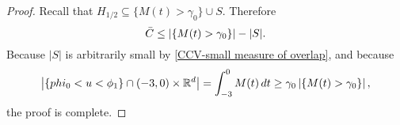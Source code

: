 \begin{proof}
Recall that $H_{1/2} \subseteq \{M(t) > \gamma_0\} \cup S$.  Therefore
\[ \bar{C} \leq \left\lvert \{M(t) > \gamma_0\} \right\rvert - |S|. \]
Because $|S|$ is arbitrarily small by \eqref{CCV-small measure of overlap}, and because
\[ \left\lvert \{phi_0 < u < \phi_1\} \cap (-3,0)\times \mathbb{R}^d \right\rvert = \int_{-3}^0 M(t) \,dt \geq \gamma_0 \left\lvert \{M(t) > \gamma_0\} \right\rvert, \]
the proof is complete.  






\end{proof}
